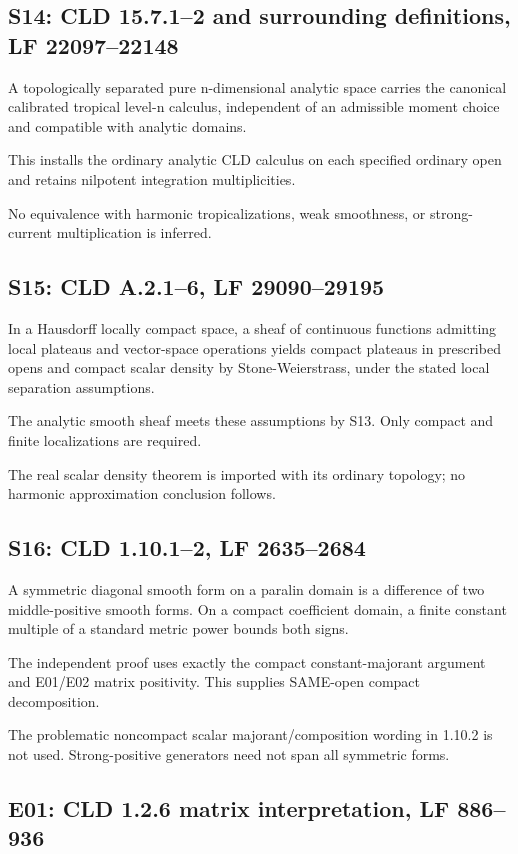 \documentclass[11pt]{article}
\begin{document}
\subsection*{S14: CLD 15.7.1--2 and surrounding definitions, LF 22097--22148}

A topologically separated pure n-dimensional analytic space carries the canonical calibrated tropical level-n calculus, independent of an admissible moment choice and compatible with analytic domains.

This installs the ordinary analytic CLD calculus on each specified ordinary open and retains nilpotent integration multiplicities.

No equivalence with harmonic tropicalizations, weak smoothness, or strong-current multiplication is inferred.

\subsection*{S15: CLD A.2.1--6, LF 29090--29195}

In a Hausdorff locally compact space, a sheaf of continuous functions admitting local plateaus and vector-space operations yields compact plateaus in prescribed opens and compact scalar density by Stone-Weierstrass, under the stated local separation assumptions.

The analytic smooth sheaf meets these assumptions by S13. Only compact and finite localizations are required.

The real scalar density theorem is imported with its ordinary topology; no harmonic approximation conclusion follows.

\subsection*{S16: CLD 1.10.1--2, LF 2635--2684}

A symmetric diagonal smooth form on a paralin domain is a difference of two middle-positive smooth forms. On a compact coefficient domain, a finite constant multiple of a standard metric power bounds both signs.

The independent proof uses exactly the compact constant-majorant argument and E01/E02 matrix positivity. This supplies SAME-open compact decomposition.

The problematic noncompact scalar majorant/composition wording in 1.10.2 is not used. Strong-positive generators need not span all symmetric forms.

\subsection*{E01: CLD 1.2.6 matrix interpretation, LF 886--936}
\end{document}
